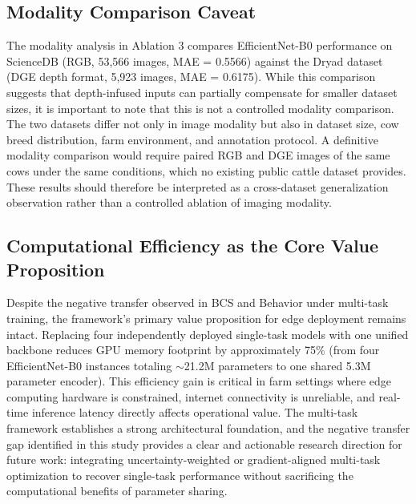 \subsection{Modality Comparison Caveat}
The modality analysis in Ablation 3 compares EfficientNet-B0 performance on ScienceDB (RGB, 53,566 images, MAE = 0.5566) against the Dryad dataset (DGE depth format, 5,923 images, MAE = 0.6175). While this comparison suggests that depth-infused inputs can partially compensate for smaller dataset sizes, it is important to note that this is not a controlled modality comparison. The two datasets differ not only in image modality but also in dataset size, cow breed distribution, farm environment, and annotation protocol. A definitive modality comparison would require paired RGB and DGE images of the same cows under the same conditions, which no existing public cattle dataset provides. These results should therefore be interpreted as a cross-dataset generalization observation rather than a controlled ablation of imaging modality.

\subsection{Computational Efficiency as the Core Value Proposition}
Despite the negative transfer observed in BCS and Behavior under multi-task training, the framework's primary value proposition for edge deployment remains intact. Replacing four independently deployed single-task models with one unified backbone reduces GPU memory footprint by approximately 75\% (from four EfficientNet-B0 instances totaling $\sim$21.2M parameters to one shared 5.3M parameter encoder). This efficiency gain is critical in farm settings where edge computing hardware is constrained, internet connectivity is unreliable, and real-time inference latency directly affects operational value. The multi-task framework establishes a strong architectural foundation, and the negative transfer gap identified in this study provides a clear and actionable research direction for future work: integrating uncertainty-weighted or gradient-aligned multi-task optimization to recover single-task performance without sacrificing the computational benefits of parameter sharing.

